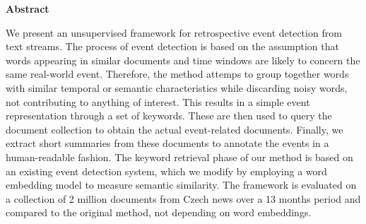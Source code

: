 \thispagestyle{plain}

\begin{center}
	\Large
	\textbf{Abstract}
\end{center}

We present an unsupervised framework for retrospective event detection from text streams. The process of event detection is based on the assumption that words appearing in similar documents and time windows are likely to concern the same real-world event. Therefore, the method attemps to group together words with similar temporal or semantic characteristics while discarding noisy words, not contributing to anything of interest. This results in a simple event representation through a set of keywords. These are then used to query the document collection to obtain the actual event-related documents. Finally, we extract short summaries from these documents to annotate the events in a human-readable fashion. The keyword retrieval phase of our method is based on an existing event detection system, which we modify by employing a word embedding model to measure semantic similarity. The framework is evaluated on a collection of 2 million documents from Czech news over a 13 months period and compared to the original method, not depending on word embeddings.